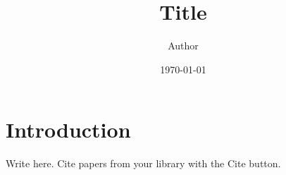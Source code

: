 \documentclass[11pt]{article}
\title{Title}
\author{Author}
\date{\today}
\begin{document}
\maketitle

\section{Introduction}
Write here. Cite papers from your library with the Cite button.



\end{document}
